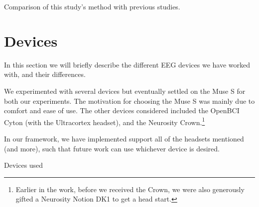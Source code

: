 \begin{landscape}
    \begin{table}
        \centering
        
        \caption{Comparison of this study's method with previous studies.}\label{table:compare-method}
    \end{table}
\end{landscape}

\section{Devices}
    
    In this section we will briefly describe the different EEG devices we have worked with, and their differences.

    We experimented with several devices but eventually settled on the Muse S for both our experiments. The motivation for choosing the Muse S was mainly due to comfort and ease of use. The other devices considered included the OpenBCI Cyton (with the Ultracortex headset), and the Neurosity Crown.\footnote{Earlier in the work, before we received the Crown, we were also generously gifted a Neurosity Notion DK1 to get a head start.} 

    In our framework, we have implemented support all of the headsets mentioned (and more), such that future work can use whichever device is desired.

    \vspace{0.5cm}
    \begin{table}[H]
        \centering
        
        \caption{Devices used}\label{table:devices}
    \end{table}
    \vspace{0.5cm}

